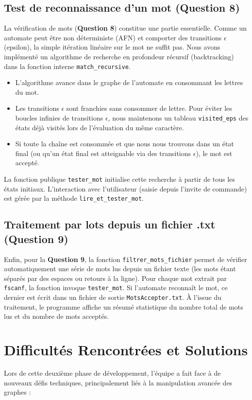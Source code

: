 \documentclass[12pt,a4paper]{article}
\begin{document}
\subsection{Test de reconnaissance d'un mot (Question 8)}
La vérification de mots (\textbf{Question 8}) constitue une partie essentielle. Comme un automate peut être non déterministe (AFN) et comporter des transitions $\epsilon$ (epsilon), la simple itération linéaire sur le mot ne suffit pas. Nous avons implémenté un algorithme de recherche en profondeur récursif (backtracking) dans la fonction interne \texttt{match\_recursive}. 
\begin{itemize}
    \item L'algorithme avance dans le graphe de l'automate en consommant les lettres du mot.
    \item Les transitions $\epsilon$ sont franchies sans consommer de lettre. Pour éviter les boucles infinies de transitions $\epsilon$, nous maintenons un tableau \texttt{visited\_eps} des états déjà visités lors de l'évaluation du même caractère.
    \item Si toute la chaîne est consommée et que nous nous trouvons dans un état final (ou qu'un état final est atteignable via des transitions $\epsilon$), le mot est accepté.
\end{itemize}
La fonction publique \texttt{tester\_mot} initialise cette recherche à partir de tous les états initiaux. L'interaction avec l'utilisateur (saisie depuis l'invite de commande) est gérée par la méthode \texttt{lire\_et\_tester\_mot}.

\subsection{Traitement par lots depuis un fichier .txt (Question 9)}
Enfin, pour la \textbf{Question 9}, la fonction \texttt{filtrer\_mots\_fichier} permet de vérifier automatiquement une série de mots lus depuis un fichier texte (les mots étant séparés par des espaces ou retours à la ligne). Pour chaque mot extrait par \texttt{fscanf}, la fonction invoque \texttt{tester\_mot}. Si l'automate reconnaît le mot, ce dernier est écrit dans un fichier de sortie \texttt{MotsAccepter.txt}. À l'issue du traitement, le programme affiche un résumé statistique du nombre total de mots lus et du nombre de mots acceptés.

\section{Difficultés Rencontrées et Solutions}
Lors de cette deuxième phase de développement, l'équipe a fait face à de nouveaux défis techniques, principalement liés à la manipulation avancée des graphes :
\end{document}
